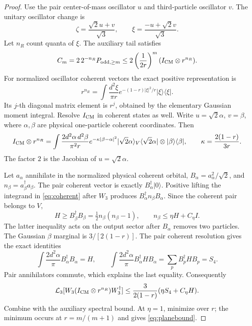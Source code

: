 \documentclass[11pt]{article}
\begin{document}
\begin{proof}
Use the pair center-of-mass oscillator $u$ and third-particle oscillator $v$. The unitary
oscillator change is
\begin{equation}
 \zeta=\frac{\sqrt2u+v}{\sqrt3},\qquad
 \xi=\frac{-u+\sqrt2v}{\sqrt3}.
\end{equation}
Let $n_R$ count quanta of $\xi$. The auxiliary tail satisfies
\begin{equation}
 C_m=2\,2^{-n_R}P_{\text{odd},\ge m}
 \le2\left(\frac1{2r}\right)^m(I_{\rm CM}\otimes r^{n_R}).
\end{equation}
For normalized oscillator coherent vectors the exact positive representation
is
\begin{equation}
 r^{n_R}=\int\frac{d^2\xi}{\pi r}
 e^{-(1-r)|\xi|^2/r}|\xi\rangle\langle\xi|.
\end{equation}
Its $j$-th diagonal matrix element is $r^j$, obtained by the elementary
Gaussian moment integral. Resolve $I_{\rm CM}$ in coherent states as well.
Write $u=\sqrt2\alpha$, $v=\beta$, where $\alpha,\beta$ are physical
one-particle coherent coordinates. Then
\begin{equation}\label{eq:coherent}
 I_{\rm CM}\otimes r^{n_R}
 =\int\frac{2d^2\alpha\,d^2\beta}{\pi^2r}
 e^{-\kappa|\beta-\alpha|^2}
 |\sqrt2\alpha\rangle_V\langle\sqrt2\alpha|
 \otimes|\beta\rangle\langle\beta|,
 \qquad \kappa=\frac{2(1-r)}{3r}.
\end{equation}
The factor $2$ is the Jacobian of $u=\sqrt2\alpha$.

Let $a_\alpha$ annihilate in the normalized physical coherent orbital,
$B_\alpha=a_\alpha^2/\sqrt2$, and $n_\beta=a_\beta^\dagger a_\beta$.
The pair coherent vector is exactly $B_\alpha^\dagger|0\rangle$.
Positive lifting the integrand in \eqref{eq:coherent} after $W_3$ produces
$B_\alpha^\dagger n_\beta B_\alpha$. Since the coherent pair belongs to $V$,
\begin{equation}\label{eq:occupation}
 H\ge B_\beta^\dagger B_\beta=\tfrac12n_\beta(n_\beta-1),\qquad
 n_\beta\le\eta H+C_\eta I.
\end{equation}
The latter inequality acts on the output sector after
$B_\alpha$ removes two particles. The Gaussian $\beta$ marginal is
$3/[2(1-r)]$. The pair coherent resolution gives the exact identities
\begin{equation}\label{eq:frames}
 \int\frac{2d^2\alpha}{\pi}B_\alpha^\dagger B_\alpha=H,\qquad
 \int\frac{2d^2\alpha}{\pi}B_\alpha^\dagger H B_\alpha
 =\sum_p B_p^\dagger H B_p=S_4.
\end{equation}
Pair annihilators commute, which explains the last equality. Consequently
\begin{equation}
 \mathcal L_3[W_3(I_{\rm CM}\otimes r^{n_R})W_3^\dagger]
 \le\frac3{2(1-r)}(\eta S_4+C_\eta H).
\end{equation}
Combine with the auxiliary spectral bound. At $\eta=1$, minimize over $r$;
the minimum occurs at $r=m/(m+1)$ and gives \eqref{eq:planebound}.
\end{proof}
\end{document}
